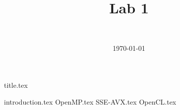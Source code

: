 \documentclass[final]{report} %
\title{Lab 1}
\author{~}
\date{\today}
\begin{document}

{title.tex}
\newpage
\tableofcontents

\newpage
{}
{introduction.tex}
{OpenMP.tex}
{SSE-AVX.tex}
{OpenCL.tex}
\newpage
{}

\printbibliography
\end{document}
